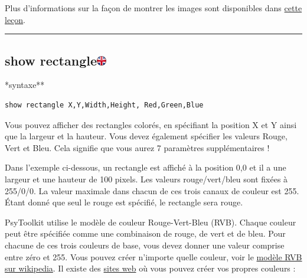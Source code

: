 \documentclass[
]{book}
\begin{document}
Plus d'informations sur la façon de montrer les images sont disponibles dans \href{https://www.psytoolkit.org/lessons/show_bitmaps.html}{cette leçon}.

\begin{center}\rule{0.5\linewidth}{\linethickness}\end{center}

\hypertarget{show-rectangle}{%
\subsection[show rectangle]{\texorpdfstring{show rectangle\href{https://www.psytoolkit.org/doc3.2.0/syntax.html\#task-show-rectangle}{\protect\includegraphics{img/ukflag.png}}}{show rectangle}}\label{show-rectangle}}

*syntaxe**

\begin{verbatim}
show rectangle X,Y,Width,Height, Red,Green,Blue
\end{verbatim}

Vous pouvez afficher des rectangles colorés, en spécifiant la position X et Y ainsi que la largeur et la hauteur. Vous devez également spécifier les valeurs Rouge, Vert et Bleu. Cela signifie que vous aurez 7 paramètres supplémentaires !

Dans l'exemple ci-dessous, un rectangle est affiché à la position 0,0 et il a une largeur et une hauteur de 100 pixels. Les valeurs rouge/vert/bleu sont fixées à 255/0/0. La valeur maximale dans chacun de ces trois canaux de couleur est 255. Étant donné que seul le rouge est spécifié, le rectangle sera rouge.

PsyToolkit utilise le modèle de couleur Rouge-Vert-Bleu (RVB). Chaque couleur peut être spécifiée comme une combinaison de rouge, de vert et de bleu. Pour chacune de ces trois couleurs de base, vous devez donner une valeur comprise entre zéro et 255. Vous pouvez créer n'importe quelle couleur, voir le \href{http://fr.wikipedia.org/wiki/Rgb}{modèle RVB sur wikipedia}. Il existe des \href{https://www.rapidtables.com/web/color/RGB_Color.html}{sites web} où vous pouvez créer vos propres couleurs :
\end{document}
